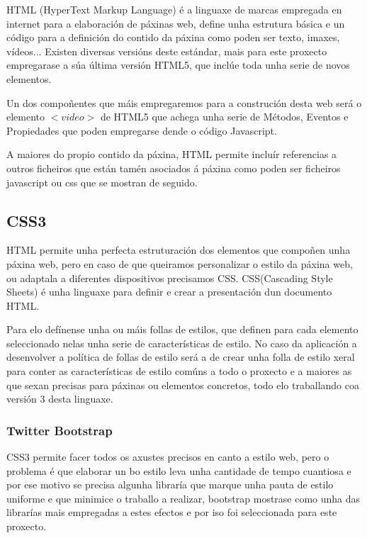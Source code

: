         HTML (HyperText Markup Language) é a linguaxe de marcas empregada en internet para a elaboración
        de páxinas web, define unha estrutura básica e un código para a definición do contido da páxina
        como poden ser texto, imaxes, vídeos... Existen diversas versións deste estándar, mais para este
        proxecto empregarase a súa última versión HTML5, que inclúe toda unha serie de novos elementos.
        
        Un dos compoñentes que máis empregaremos para a construción desta web será o elemento 
        $<video>$ de HTML5 que achega unha serie de Métodos, Eventos e Propiedades
        \cite{w3school-video-events} que poden empregarse dende o código Javascript.
        
        A maiores do propio contido da páxina, HTML permite incluír referencias a outros ficheiros que 
        están tamén asociados á páxina como poden ser ficheiros javascript ou css que se mostran de 
        seguido.
    
    \subsection{CSS3}
        HTML permite unha perfecta estruturación dos elementos que compoñen unha páxina web, pero 
        en caso de que queiramos personalizar o estilo da páxina web, ou adaptala a diferentes 
        dispositivos precisamos CSS. CSS(Cascading Style Sheets) é unha linguaxe para definir e 
        crear a presentación dun documento HTML.
        
        Para elo defínense unha ou máis follas de estilos, que definen para cada elemento 
        seleccionado nelas unha serie de características de estilo. No caso da aplicación a 
        desenvolver a política de follas de estilo será a de crear unha folla de estilo xeral para 
        conter as características de estilo comúns a todo o proxecto e a maiores as que sexan 
        precisas para páxinas ou elementos concretos, todo elo traballando coa versión 3 desta linguaxe.
        
        \subsubsection{Twitter Bootstrap}
            CSS3 permite facer todos os axustes precisos en canto a estilo web, pero o problema é 
            que elaborar un bo estilo leva unha cantidade de tempo cuantiosa e por ese motivo se 
            precisa algunha libraría que marque unha pauta de estilo uniforme e que minimice o 
            traballo a realizar, bootstrap mostrase como unha das librarías mais empregadas a estes
            efectos e por iso foi seleccionada para este proxecto.
        
